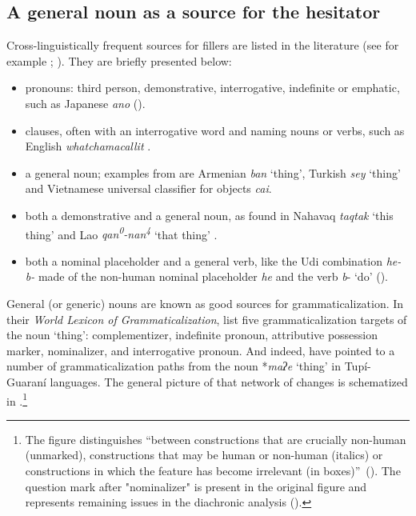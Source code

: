 \documentclass[output=paper]{langscibook}
\begin{document}
\subsection{A general noun as a source for the hesitator}
\label{sec:rose:5.1}
Cross-linguistically frequent sources for fillers are listed in the literature (see for example \citealt{Podlesskaya2010}; \citealt{Enfield2003}). They are briefly presented below:

\begin{itemize}
\item pronouns: third person, demonstrative, interrogative, indefinite or emphatic, such as Japanese \textit{ano} (\citealt[507]{HayashiYoon2006}).
\item clauses, often with an interrogative word and naming nouns or verbs, such as English \textit{whatchamacallit} \citep{Enfield2003}.
\item a general noun; examples from \citet[13]{Podlesskaya2010} are Armenian \textit{ban} ‘thing’, Turkish \textit{sey} ‘thing’ and Vietnamese universal classifier for objects \textit{cai}.
\item both a demonstrative and a general noun, as found in Nahavaq \textit{taqtak} ‘this thing’ \citep[209]{Dimock2010} and Lao\textit{ qan\textsuperscript{0}{}-nan\textsuperscript{4}} ‘that thing’ \citep{Enfield2003}. 
\item both a nominal placeholder and a general verb, like the Udi combination \textit{he-b-} made of the non-human nominal placeholder \textit{he} and the verb \textit{b}{}- ‘do’ (\citealt[102]{GanenkovGanenkov2010}).
\end{itemize}

General (or generic) nouns are known as good sources for grammaticalization. In their \textit{World Lexicon of Grammaticalization}, \citet[432--435]{KutevaKuteva2019} list five grammaticalization targets of the noun ‘thing’: complementizer, indefinite pronoun, attributive possession marker, nominalizer, and interrogative pronoun. And indeed, \citet{AuweraAuwera2021} have pointed to a number of grammaticalization paths from the noun *\textit{maʔe} ‘thing’ in Tupí-Guaraní languages. The general picture of that network of changes is schematized in .\footnote{The figure distinguishes “between constructions that are crucially non-human (unmarked), constructions that may be human or non-human (italics) or constructions in which the feature has become irrelevant (in boxes)”~(\citealt[89]{AuweraAuwera2021}). The question mark after "nominalizer" is present in the original figure and represents remaining issues in the diachronic analysis (\citealt[82--87]{AuweraAuwera2021}).}
\end{document}
